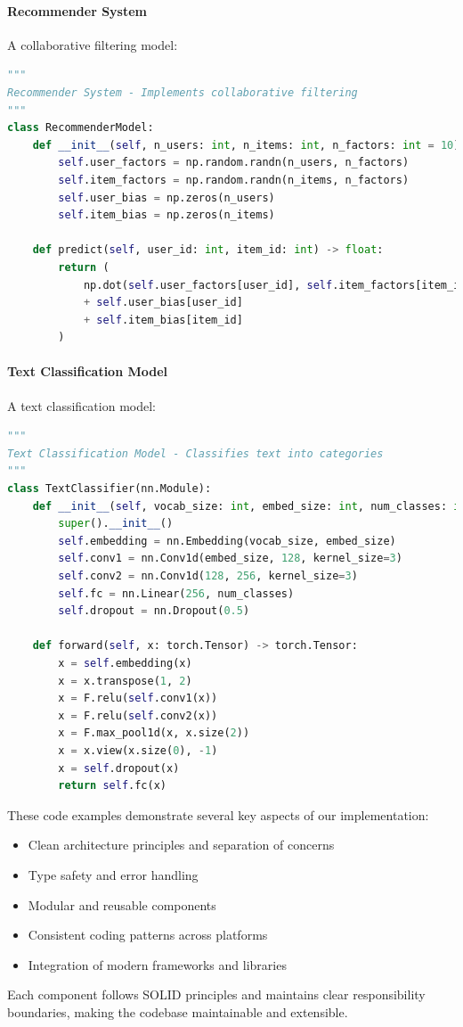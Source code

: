 \paragraph{Recommender System}
A collaborative filtering model:

\begin{lstlisting}[language=Python, caption={Recommender System}]
"""
Recommender System - Implements collaborative filtering
"""
class RecommenderModel:
    def __init__(self, n_users: int, n_items: int, n_factors: int = 10):
        self.user_factors = np.random.randn(n_users, n_factors)
        self.item_factors = np.random.randn(n_items, n_factors)
        self.user_bias = np.zeros(n_users)
        self.item_bias = np.zeros(n_items)

    def predict(self, user_id: int, item_id: int) -> float:
        return (
            np.dot(self.user_factors[user_id], self.item_factors[item_id])
            + self.user_bias[user_id]
            + self.item_bias[item_id]
        )
\end{lstlisting}

\paragraph{Text Classification Model}
A text classification model:

\begin{lstlisting}[language=Python, caption={Text Classification Model}]
"""
Text Classification Model - Classifies text into categories
"""
class TextClassifier(nn.Module):
    def __init__(self, vocab_size: int, embed_size: int, num_classes: int):
        super().__init__()
        self.embedding = nn.Embedding(vocab_size, embed_size)
        self.conv1 = nn.Conv1d(embed_size, 128, kernel_size=3)
        self.conv2 = nn.Conv1d(128, 256, kernel_size=3)
        self.fc = nn.Linear(256, num_classes)
        self.dropout = nn.Dropout(0.5)

    def forward(self, x: torch.Tensor) -> torch.Tensor:
        x = self.embedding(x)
        x = x.transpose(1, 2)
        x = F.relu(self.conv1(x))
        x = F.relu(self.conv2(x))
        x = F.max_pool1d(x, x.size(2))
        x = x.view(x.size(0), -1)
        x = self.dropout(x)
        return self.fc(x)
\end{lstlisting}

These code examples demonstrate several key aspects of our implementation:

\begin{itemize}
    \item Clean architecture principles and separation of concerns
    \item Type safety and error handling
    \item Modular and reusable components
    \item Consistent coding patterns across platforms
    \item Integration of modern frameworks and libraries
\end{itemize}

Each component follows SOLID principles and maintains clear responsibility boundaries, making the codebase maintainable and extensible. 
